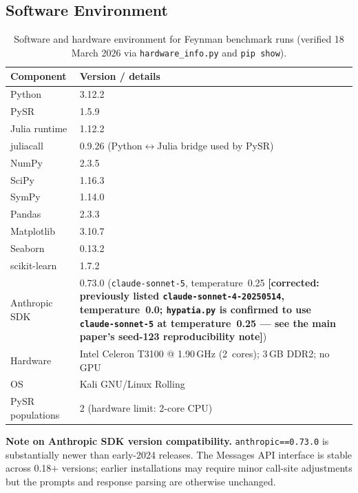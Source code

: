 \documentclass[twoside,11pt]{article}
\begin{document}
\subsection*{Software Environment}

\begin{table}[H]
\centering
\caption{Software and hardware environment for Feynman benchmark runs
         (verified 18 March 2026 via \texttt{hardware\_info.py} and
         \texttt{pip show}).}
\label{tab:software_env}
\small
\begin{tabular}{ll}
\toprule
\textbf{Component} & \textbf{Version / details} \\
\midrule
Python           & 3.12.2 \\
PySR             & 1.5.9 \\
Julia runtime    & 1.12.2 \\
juliacall        & 0.9.26 (Python$\leftrightarrow$Julia bridge used by PySR) \\
NumPy            & 2.3.5 \\
SciPy            & 1.16.3 \\
SymPy            & 1.14.0 \\
Pandas           & 2.3.3 \\
Matplotlib       & 3.10.7 \\
Seaborn          & 0.13.2 \\
scikit-learn     & 1.7.2 \\
Anthropic SDK    & 0.73.0 (\texttt{claude-sonnet-5},
                   temperature~0.25 \textbf{[corrected: previously listed
                   \texttt{claude-sonnet-4-20250514}, temperature~0.0;
                   \texttt{hypatia.py} is confirmed to use
                   \texttt{claude-sonnet-5} at temperature~0.25 --- see
                   the main paper's seed-123 reproducibility note]}) \\
\midrule
Hardware         & Intel Celeron T3100 @ 1.90\,GHz (2~cores);
                   3\,GB DDR2; no GPU \\
OS               & Kali GNU/Linux Rolling \\
PySR populations & 2 (hardware limit: 2-core CPU) \\
\bottomrule
\end{tabular}
\end{table}

\noindent\textbf{Note on Anthropic SDK version compatibility.}
\texttt{anthropic==0.73.0} is substantially newer than early-2024 releases.
The Messages API interface is stable across 0.18$+$ versions; earlier
installations may require minor call-site adjustments but the prompts and
response parsing are otherwise unchanged.
\end{document}
